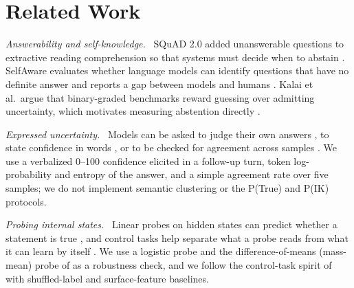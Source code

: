 \documentclass[10pt]{article}
\renewcommand{\paragraph}[1]{\par\vspace{0.3em}\noindent\textit{#1}\ }
\begin{document}
\section{Related Work}
\paragraph{Answerability and self-knowledge.}
SQuAD 2.0 added unanswerable questions to extractive reading comprehension so that systems must decide when to abstain \citep{rajpurkar2018squad2}. SelfAware evaluates whether language models can identify questions that have no definite answer and reports a gap between models and humans \citep{yin2023selfaware}. Kalai et al.\ argue that binary-graded benchmarks reward guessing over admitting uncertainty, which motivates measuring abstention directly \citep{kalai2025hallucinate}.

\paragraph{Expressed uncertainty.}
Models can be asked to judge their own answers \citep{kadavath2022know}, to state confidence in words \citep{lin2022words,xiong2024express}, or to be checked for agreement across samples \citep{manakul2023selfcheck,kuhn2023semantic}. We use a verbalized 0--100 confidence elicited in a follow-up turn, token log-probability and entropy of the answer, and a simple agreement rate over five samples; we do not implement semantic clustering or the P(True) and P(IK) protocols.

\paragraph{Probing internal states.}
Linear probes on hidden states can predict whether a statement is true \citep{azaria2023internal,burns2023ccs,marks2024geometry}, and control tasks help separate what a probe reads from what it can learn by itself \citep{hewitt2019control,belinkov2022probing}. We use a logistic probe and the difference-of-means (mass-mean) probe of \citet{marks2024geometry} as a robustness check, and we follow the control-task spirit of \citet{hewitt2019control} with shuffled-label and surface-feature baselines.
\end{document}
